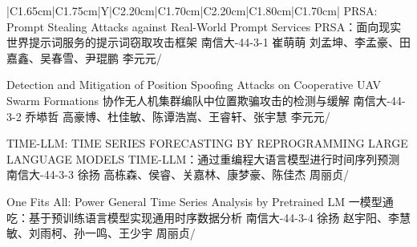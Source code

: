 \Needspace{7.5cm}
\begin{tabularx}{\textwidth}{|C{1.65cm}|C{1.75cm}|Y|C{2.20cm}|C{1.70cm}|C{2.20cm}|C{1.80cm}|C{1.70cm}|}
\HeaderRow
{}
{PRSA: Prompt Stealing Attacks against Real-World Prompt Services \newline
PRSA：面向现实世界提示词服务的提示词窃取攻击框架}
{南信大-44-3-1}
{崔萌萌}
{刘孟坤、李孟豪、田嘉鑫、吴春雪、尹琨鹏}
{李元元}{/}

{Detection and Mitigation of Position Spoofing Attacks on Cooperative UAV Swarm Formations\newline  
协作无人机集群编队中位置欺骗攻击的检测与缓解}
{南信大-44-3-2}
{乔塨哲}
{高豪博、杜佳敏、陈谭浩嵩、王睿轩、张宇慧}
{李元元}{/}


{TIME-LLM: TIME SERIES FORECASTING BY REPROGRAMMING LARGE LANGUAGE MODELS \newline TIME-LLM：通过重编程大语言模型进行时间序列预测}
{南信大-44-3-3}
{徐扬}
{高栋森、侯睿、关嘉林、康梦豪、陈佳杰}
{周丽贞}{/}

{One Fits All: Power General Time Series Analysis by Pretrained LM  \newline   一模型通吃：基于预训练语言模型实现通用时序数据分析}
{南信大-44-3-4}
{徐扬}
{赵宇阳、李慧敏、刘雨柯、孙一鸣、王少宇}
{周丽贞}{/}
\end{tabularx}
\BlockGap







